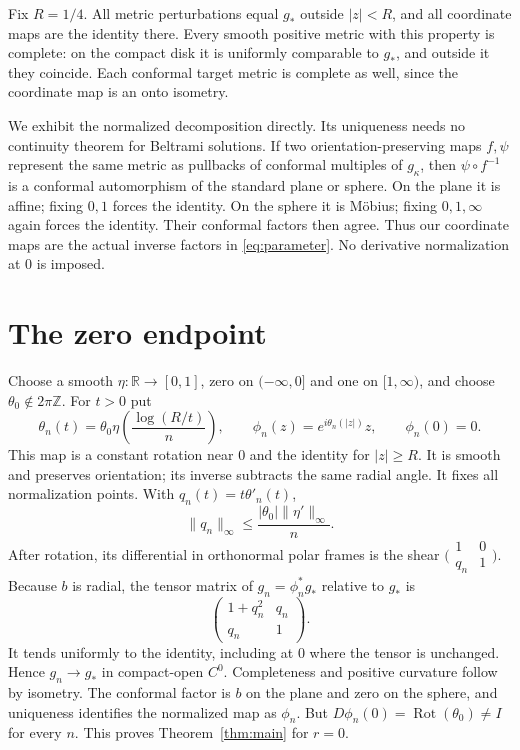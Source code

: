 \documentclass[11pt]{article}
\newcommand{\R}{\mathbb R}
\begin{document}
Fix $R=1/4$. All metric perturbations equal $g_*$ outside $|z|<R$, and all coordinate maps are the identity there. Every smooth positive metric with this property is complete: on the compact disk it is uniformly comparable to $g_*$, and outside it they coincide. Each conformal target metric is complete as well, since the coordinate map is an onto isometry.

We exhibit the normalized decomposition directly. Its uniqueness needs no continuity theorem for Beltrami solutions. If two orientation-preserving maps $f,\psi$ represent the same metric as pullbacks of conformal multiples of $g_\kappa$, then $\psi\circ f^{-1}$ is a conformal automorphism of the standard plane or sphere. On the plane it is affine; fixing $0,1$ forces the identity. On the sphere it is M\"obius; fixing $0,1,\infty$ again forces the identity. Their conformal factors then agree. Thus our coordinate maps are the actual inverse factors in \eqref{eq:parameter}. No derivative normalization at $0$ is imposed.

\section{The zero endpoint}
Choose a smooth $\eta:\R\to[0,1]$, zero on $(-\infty,0]$ and one on $[1,\infty)$, and choose $\theta_0\notin2\pi\mathbb Z$. For $t>0$ put
\[
 \theta_n(t)=\theta_0\eta\left(\frac{\log(R/t)}n\right),\qquad
 \phi_n(z)=e^{i\theta_n(|z|)}z,\qquad \phi_n(0)=0.
\]
This map is a constant rotation near $0$ and the identity for $|z|\geq R$. It is smooth and preserves orientation; its inverse subtracts the same radial angle. It fixes all normalization points. With $q_n(t)=t\theta'_n(t)$,
\[
 \|q_n\|_\infty\leq\frac{|\theta_0|\|\eta'\|_\infty}{n}.
\]
After rotation, its differential in orthonormal polar frames is the shear $\bigl(\begin{smallmatrix}1&0\\q_n&1\end{smallmatrix}\bigr)$. Because $b$ is radial, the tensor matrix of $g_n=\phi_n^*g_*$ relative to $g_*$ is
\[
 \begin{pmatrix}1+q_n^2&q_n\\q_n&1\end{pmatrix}.
\]
It tends uniformly to the identity, including at $0$ where the tensor is unchanged. Hence $g_n\to g_*$ in compact-open $C^0$. Completeness and positive curvature follow by isometry. The conformal factor is $b$ on the plane and zero on the sphere, and uniqueness identifies the normalized map as $\phi_n$. But $D\phi_n(0)=\operatorname{Rot}(\theta_0)\ne I$ for every $n$. This proves Theorem~\ref{thm:main} for $r=0$.
\end{document}
